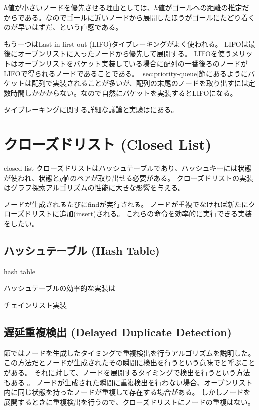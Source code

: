$h$値が小さいノードを優先させる理由としては、$h$値がゴールへの距離の推定だからである。なのでゴールに近いノードから展開したほうがゴールにたどり着くのが早いはずだ、という直感である。

もう一つはLast-in-first-out (LIFO)タイブレーキングがよく使われる。
LIFOは最後にオープンリストに入ったノードから優先して展開する。
LIFOを使うメリットはオープンリストをバケット実装している場合に配列の一番後ろのノードがLIFOで得られるノードであることである。
\ref{sec:priority-queue}節にあるようにバケットは配列で実装されることが多いが、配列の末尾のノードを取り出すには定数時間しかかからない。なので自然にバケットを実装するとLIFOになる。


タイブレーキングに関する詳細な議論と実験は\cite{asai2016tiebreaking}にある。

\section{クローズドリスト (Closed List)}
\label{sec:closed-list}
{\TODO closed list}
クローズドリストはハッシュテーブルであり、ハッシュキーには状態が使われ、状態と$g$値のペアが取り出せる必要がある。
クローズドリストの実装はグラフ探索アルゴリズムの性能に大きな影響を与える。

ノードが生成されるたびにfindが実行される。
ノードが重複でなければ新たにクローズドリストに追加(insert)される。
これらの命令を効率的に実行できる実装をしたい。


\subsection{ハッシュテーブル (Hash Table)}
\label{sec:hash-table}

{\TODO hash table}

ハッシュテーブルの効率的な実装は

チェインリスト実装


\subsection{遅延重複検出 (Delayed Duplicate Detection)}
\label{sec:graph-search-algorithm}節ではノードを生成したタイミングで重複検出を行うアルゴリズムを説明した。この方法だとノードが生成されたその瞬間に検出を行うという意味でと呼ぶことがある。
それに対して、ノードを展開するタイミングで検出を行うという方法もある \cite{korf2003delayed}。
ノードが生成された瞬間に重複検出を行わない場合、オープンリスト内に同じ状態を持ったノードが重複して存在する場合がある。
しかしノードを展開するときに重複検出を行うので、クローズドリストにノードの重複はない。

